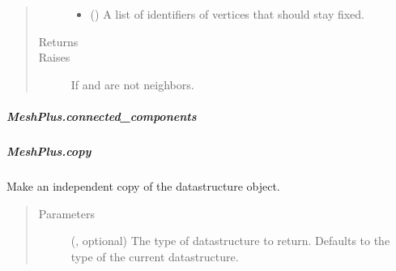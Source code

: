 \documentclass[letterpaper,10pt,english]{sphinxmanual}
\begin{document}
\begin{fulllineitems}
\begin{fulllineitems}
\begin{quote}
\begin{description}
\begin{itemize}
\item {} 
 () \textendash{} A list of identifiers of vertices that should stay fixed.

\end{itemize}

\item[{Returns}] \leavevmode
{}

\item[{Raises}] \leavevmode
{} \textendash{} If  and  are not neighbors.

\end{description}\end{quote}

\end{fulllineitems}



\subparagraph{MeshPlus.connected\_components}
\label{\detokenize{api/generated/directional_clustering.mesh.MeshPlus.connected_components:meshplus-connected-components}}\label{\detokenize{api/generated/directional_clustering.mesh.MeshPlus.connected_components::doc}}

\begin{fulllineitems}
\label{\detokenize{api/generated/directional_clustering.mesh.MeshPlus.connected_components:directional_clustering.mesh.MeshPlus.connected_components}}
\end{fulllineitems}



\subparagraph{MeshPlus.copy}
\label{\detokenize{api/generated/directional_clustering.mesh.MeshPlus.copy:meshplus-copy}}\label{\detokenize{api/generated/directional_clustering.mesh.MeshPlus.copy::doc}}

\begin{fulllineitems}
\label{\detokenize{api/generated/directional_clustering.mesh.MeshPlus.copy:directional_clustering.mesh.MeshPlus.copy}}
Make an independent copy of the datastructure object.
\begin{quote}\begin{description}
\item[{Parameters}] \leavevmode
{} (, optional) \textendash{} The type of datastructure to return.
Defaults to the type of the current datastructure.


\end{description}
\end{quote}
\end{fulllineitems}
\end{fulllineitems}
\end{document}
